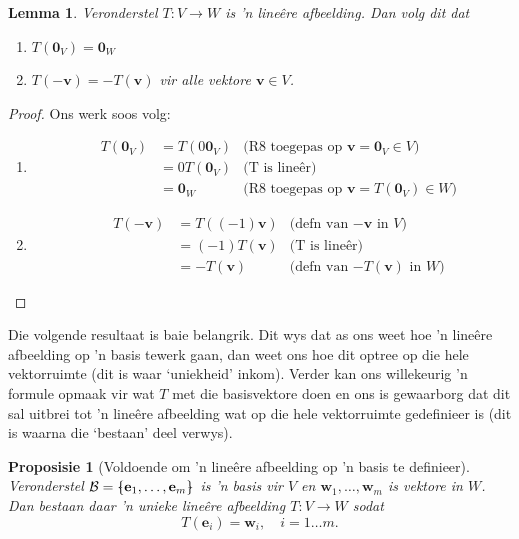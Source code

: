 \documentclass[a4paper,11pt]{book}
\newtheorem{lemma}[theorem]{Lemma}
\newtheorem{proposition}[theorem]{Proposisie}
\theoremstyle{definition}
\newcommand{\ve}[1]{\mathbf{#1}}
\newcommand{\basis}[1]{{\mathcal #1}}
\newcommand{\bmark}{\raisebox{.53ex}{\rule{.2em}{.1ex}}}
\newcommand{\bopen}{{\protect\ooalign{\{\cr\hfil\bmark\hfil\cr}}}
\newcommand{\bclose}{{\protect\ooalign{\}\cr\hfil\bmark\hfil\cr}}}
\begin{document}
\begin{lemma} Veronderstel $T : V \rightarrow W$ is 'n line{\^e}re
	afbeelding. Dan volg dit dat
	\begin{enumerate}
		\item $T(\ve{0}_V) = \ve{0}_W$
		\item $T(-\ve{v}) = - T(\ve{v})$ vir alle vektore $\ve{v} \in V$.
	\end{enumerate}
\end{lemma}
\begin{proof} 
	Ons werk soos volg:
	\begin{enumerate}
		\item 
			\begin{align*}
				\mbox{} \quad T(\ve{0}_V) &= T( 0 \ve{0}_V) & \mbox{(R8
				toegepas op $\ve{v} = \ve{0}_V \in V$)} \\
				&= 0T(\ve{0}_V) & \mbox{(T is line{\^e}r)} \\
				&= \ve{0}_W & \mbox{(R8 toegepas op $\ve{v} = T(\ve{0}_V)
				\in W$)}
			\end{align*}
		\item
			\begin{align*}
				\mbox{} \quad  T(-\ve{v}) &= T( (-1) \ve{v}) & \mbox{(defn
				van $-\ve{v}$ in $V$)} \\
				&= (-1) T(\ve{v}) & \mbox{(T is line{\^e}r)} \\
				&= - T(\ve{v}) & \mbox{(defn van $-T(\ve{v})$ in $W$)}
			\end{align*}
	\end{enumerate}
\end{proof}
Die volgende resultaat is baie belangrik. Dit wys dat as ons weet hoe 'n
line{\^e}re afbeelding op 'n basis tewerk gaan, dan weet ons hoe dit optree
op die hele vektorruimte (dit is waar `uniekheid' inkom). Verder kan ons
willekeurig 'n formule opmaak vir wat $T$ met die basisvektore doen en ons
is gewaarborg dat dit sal uitbrei tot 'n line{\^e}re afbeelding wat op die
hele vektorruimte gedefinieer is (dit is waarna die `bestaan' deel verwys).

\begin{proposition}[Voldoende om 'n line{\^e}re afbeelding op 'n basis te
	definieer] \label{defining_linear_map_on_basis} 
	Veronderstel $\basis{B} = \bopen \ve{e}_1, \ldots, \ve{e}_m \bclose$ 
	is 'n basis vir $V$ en $\ve{w}_1, \ldots, \ve{w}_m$ is vektore in $W$.
	Dan bestaan daar 'n unieke line{\^e}re afbeelding $T : V \rightarrow W$
	sodat
	\[
		T(\ve{e}_i) = \ve{w}_i, \quad i = 1 \ldots m.
	\]
\end{proposition}
\end{document}
